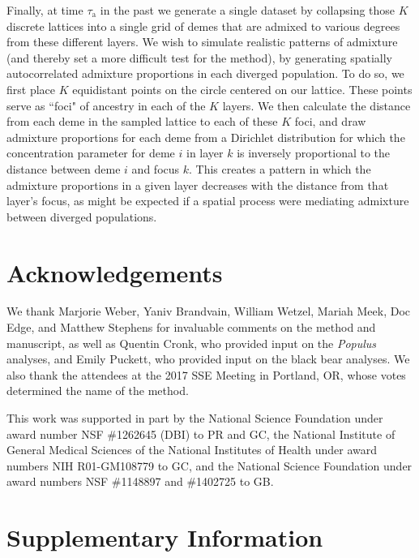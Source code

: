 \documentclass[10pt,letterpaper]{article}
\newif\ifsubmissionversion
\newif\ifincludesupplement
\begin{document}
Finally, at time $\tau_{\text{a}}$ in the past 
we generate a single dataset 
by collapsing those $K$ discrete lattices into a single grid of demes 
that are admixed to various degrees from these different layers. 
We wish to simulate realistic patterns of admixture 
(and thereby set a more difficult test for the method), 
by generating spatially autocorrelated admixture proportions 
in each diverged population.
To do so, we first place $K$ equidistant points on the circle centered on our lattice.  
These points serve as ``foci" of ancestry in each of the $K$ layers.  
We then calculate the distance from each deme in the sampled lattice to each of these $K$ foci, 
and draw admixture proportions for each deme 
from a Dirichlet distribution for which the concentration parameter 
for deme $i$ in layer $k$ is inversely proportional to the distance between deme $i$ and focus $k$. 
This creates a pattern in which the admixture proportions in a given layer decreases 
with the distance from that layer's focus, 
as might be expected if a spatial process were mediating admixture between diverged populations.

\section*{Acknowledgements}

We thank Marjorie Weber, Yaniv Brandvain, William Wetzel, 
Mariah Meek, Doc Edge, and Matthew Stephens 
for invaluable comments on the method and manuscript, 
as well as Quentin Cronk, who provided input on the \textit{Populus} analyses, 
and Emily Puckett, who provided input on the black bear analyses.
We also thank the attendees at the 2017 SSE Meeting in Portland, OR, 
whose votes determined the name of the method.
\ifsubmissionversion
\else
This work was supported in part by 
the National Science Foundation under award number NSF \#1262645 (DBI) to PR and GC, 
the National Institute of General Medical Sciences of the National
Institutes of Health under award numbers NIH R01-GM108779 to GC,
and the National Science Foundation under award numbers NSF \#1148897 and \#1402725 to GB.
\fi


\newpage
\clearpage



\ifincludesupplement

\clearpage
\newpage
\section*{Supplementary Information}
\renewcommand{\theequation}{S\arabic{equation}}
\setcounter{equation}{0}
\renewcommand{\thetable}{S\arabic{table}}
\setcounter{table}{0}
\renewcommand{\thefigure}{S\arabic{figure}}
\setcounter{figure}{0}
\end{document}
